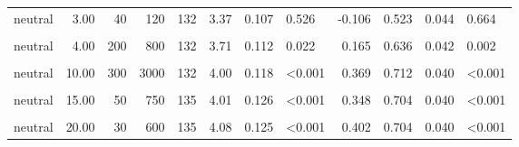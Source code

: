 \documentclass[
]{article}
\begin{document}
\begin{longtable}[t]{lrrrrrrlrrrl}
\hspace{1em}neutral & 3.00 & 40 & 120 & 132 & 3.37 & 0.107 & 0.526 & -0.106 & 0.523 & 0.044 & 0.664\\
\hspace{1em}\cellcolor{gray!10}{neutral} & \cellcolor{gray!10}{4.00} & \cellcolor{gray!10}{20} & \cellcolor{gray!10}{80} & \cellcolor{gray!10}{135} & \cellcolor{gray!10}{3.18} & \cellcolor{gray!10}{0.123} & \cellcolor{gray!10}{0.013} & \cellcolor{gray!10}{-0.226} & \cellcolor{gray!10}{0.430} & \cellcolor{gray!10}{0.043} & \cellcolor{gray!10}{0.121}\\
\hspace{1em}neutral & 4.00 & 200 & 800 & 132 & 3.71 & 0.112 & 0.022 & 0.165 & 0.636 & 0.042 & 0.002\\
\hspace{1em}\cellcolor{gray!10}{neutral} & \cellcolor{gray!10}{10.00} & \cellcolor{gray!10}{40} & \cellcolor{gray!10}{400} & \cellcolor{gray!10}{135} & \cellcolor{gray!10}{3.85} & \cellcolor{gray!10}{0.120} & \cellcolor{gray!10}{0.002} & \cellcolor{gray!10}{0.253} & \cellcolor{gray!10}{0.674} & \cellcolor{gray!10}{0.041} & \cellcolor{gray!10}{<0.001}\\
\hspace{1em}neutral & 10.00 & 300 & 3000 & 132 & 4.00 & 0.118 & <0.001 & 0.369 & 0.712 & 0.040 & <0.001\\
\hspace{1em}\cellcolor{gray!10}{neutral} & \cellcolor{gray!10}{15.00} & \cellcolor{gray!10}{20} & \cellcolor{gray!10}{300} & \cellcolor{gray!10}{132} & \cellcolor{gray!10}{4.03} & \cellcolor{gray!10}{0.120} & \cellcolor{gray!10}{<0.001} & \cellcolor{gray!10}{0.386} & \cellcolor{gray!10}{0.705} & \cellcolor{gray!10}{0.040} & \cellcolor{gray!10}{<0.001}\\
\hspace{1em}neutral & 15.00 & 50 & 750 & 135 & 4.01 & 0.126 & <0.001 & 0.348 & 0.704 & 0.040 & <0.001\\
\hspace{1em}\cellcolor{gray!10}{neutral} & \cellcolor{gray!10}{20.00} & \cellcolor{gray!10}{10} & \cellcolor{gray!10}{200} & \cellcolor{gray!10}{132} & \cellcolor{gray!10}{4.23} & \cellcolor{gray!10}{0.121} & \cellcolor{gray!10}{<0.001} & \cellcolor{gray!10}{0.523} & \cellcolor{gray!10}{0.735} & \cellcolor{gray!10}{0.039} & \cellcolor{gray!10}{<0.001}\\
\hspace{1em}neutral & 20.00 & 30 & 600 & 135 & 4.08 & 0.125 & <0.001 & 0.402 & 0.704 & 0.040 & <0.001\\

\end{longtable}
\end{document}

